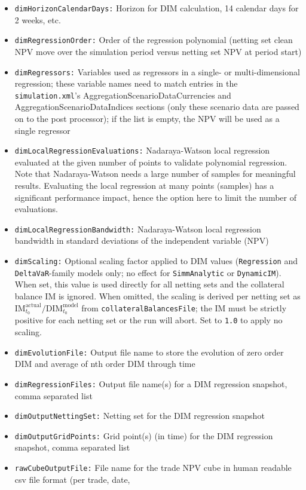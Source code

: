 \begin{itemize}
\item {\tt dimHorizonCalendarDays:} Horizon for DIM calculation, 14 calendar days for 2 weeks, etc.
\item {\tt dimRegressionOrder:} Order of the regression polynomial (netting set clean NPV move over the simulation
period versus netting set NPV at period start)
\item {\tt dimRegressors:} Variables used as regressors in a single- or multi-dimensional regression; these variable
  names need to match entries in the {\tt simulation.xml}'s AggregationScenarioDataCurrencies and
  AggregationScenarioDataIndices sections (only these scenario data are passed on to the post processor); if the list is
  empty, the NPV will be used as a single regressor
\item {\tt dimLocalRegressionEvaluations:} Nadaraya-Watson local regression evaluated at the given number of points to
validate polynomial regression. Note that Nadaraya-Watson needs a large number of samples for meaningful
results. Evaluating the local regression at many points (samples) has a significant performance impact, hence the option
here to limit the number of evaluations.
\item {\tt dimLocalRegressionBandwidth:} Nadaraya-Watson local regression bandwidth in standard deviations of the
independent variable (NPV)
\item {\tt dimScaling:} Optional scaling factor applied to DIM values ({\tt Regression} and
{\tt DeltaVaR}-family models only; no effect for {\tt SimmAnalytic} or {\tt DynamicIM}).
When set, this value is used directly for all netting sets and the collateral balance IM is
ignored. When omitted, the scaling is derived per netting set as
$\text{IM}_{t_0}^{\text{actual}}/\text{DIM}_{t_0}^{\text{model}}$ from
{\tt collateralBalancesFile}; the IM must be strictly positive for each netting set or the
run will abort. Set to {\tt 1.0} to apply no scaling.
\item {\tt dimEvolutionFile:} Output file name to store the evolution of zero order DIM and average of nth order DIM
through time
\item {\tt dimRegressionFiles:} Output file name(s) for a DIM regression snapshot, comma separated list
\item {\tt dimOutputNettingSet:} Netting set for the DIM regression snapshot
\item {\tt dimOutputGridPoints:} Grid point(s) (in time) for the DIM regression snapshot, comma separated list
\item {\tt rawCubeOutputFile:} File name for the trade NPV cube in human readable csv file format (per trade, date,

\end{itemize}
